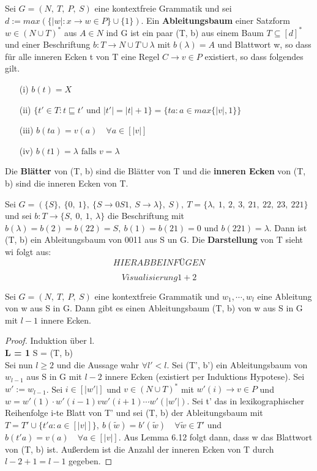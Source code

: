     Sei \(G = (N,\ T,\ P,\ S)\) eine kontextfreie Grammatik und sei \(d:= max (\{|w|: x \to w \in P\} \cup \{1\})\). Ein \textbf{Ableitungsbaum} einer Satzform \(w \in (N \cup T)^*\) aus \(A \in N\) ind G ist ein paar (T, b) aus einem Baum \(T \subseteq [d]^*\) und einer Beschriftung \(b: T \to N \cup T \cup {\lambda}\) mit \(b(\lambda) = A\) und Blattwort w, so dass für alle inneren Ecken t von T eine Regel \(C \to v \in P\) existiert, so dass folgendes gilt.
    \begin{itemize}
        \item [(i)] \(b(t) = X\)
        \item [(ii)] \(\{t' \in T : t \sqsubseteq t' \text{ und } |t'| = |t| + 1\} = \{ta : a \in max \{|v|, 1\}\}\)
        \item [(iii)] \(b(ta) = v(a) \quad \forall a \in [|v|]\)
        \item [(iv)] \(b(t1) = \lambda \text{ falls } v = \lambda\)
    \end{itemize}
    Die \textbf{Blätter} von (T, b) sind die Blätter von T und die \textbf{inneren Ecken} von (T, b) sind die inneren Ecken von T.

    Sei \(G = (\{S\},\ \{0,\ 1\},\ \{S \to 0S1,\ S \to \lambda\},\ S),\ T = \{\lambda,\ 1,\ 2,\ 3,\ 21,\ 22,\ 23,\ 221\}\) und sei \(b:T\to\{S,\ 0,\ 1,\ \lambda\}\) die Beschriftung mit \(b(\lambda) = b(2) = b(22) = S,\ b(1) = b(21) = 0\) und \(b(221) = \lambda\). Dann ist (T, b) ein Ableitungsbaum von 0011 aus S un G. Die \textbf{Darstellung} von T sieht wi folgt aus: \[HIERABBEINFÜGEN\]

    \[Visualisierung 1 + 2 \]

    Sei \(G = (N,\ T,\ P,\ S)\) eine kontextfreie Grammatik und \(w_1, \cdots, w_l\) eine Ableitung von w aus S in G. Dann gibt es einen Ableitungsbaum (T, b) von w aus S in G mit \(l-1\) innere Ecken. 
    \begin{proof}
        Induktion über l.\\
        \textbf{L = 1} S = (T, b)\\
        Sei nun \(l \geq 2\) und die Aussage wahr \(\forall l' < l\). Sei (T', b') ein Ableitungsbaum von \(w_{l-1}\) aus S in G mit \(l-2\) innere Ecken (existiert per Induktions Hypotese). Sei \(w' := w_{l-1}\). Sei \(i \in [|w'|]\) und \(v \in (N \cup T)^*\) mit \(w'(i) \to v \in P\) und \(w = w'(1) \cdot w'(i-1) v w'(i+1)\cdots w'(|w'|)\). Sei t' das in lexikographischer Reihenfolge i-te Blatt von T' und sei (T, b) der Ableitungsbaum mit \(T = T' \cup \{t'a : a \in [|v|]\},\ b(\tilde{w}) = b'(\tilde{w}) \quad \forall \tilde{w} \in T'\) und \(b(t'a) = v(a) \quad \forall a \in [|v|]\). Aus Lemma 6.12 folgt dann, dass w das Blattwort von (T, b) ist. Außerdem ist die Anzahl der inneren Ecken von T durch \(l - 2 + 1 = l - 1\) gegeben.
    \end{proof}

